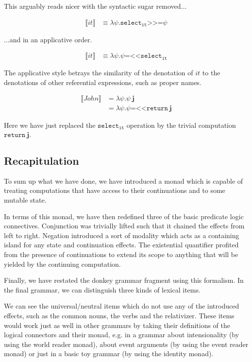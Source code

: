 \documentclass{article}
\newcommand{\hsbind}{\mathbin{\texttt{>>=}}}
\newcommand{\hsrevbind}{\mathbin{\texttt{=<<}}}
\begin{document}
This arguably reads nicer with the syntactic sugar removed...

\begin{align*}
  \llbracket it \rrbracket & \equiv \lambda \psi.
    \texttt{select}_\texttt{it} \hsbind \psi
\end{align*}

...and in an applicative order.

\begin{align*}
  \llbracket it \rrbracket & \equiv \lambda \psi.
    \psi \hsrevbind \texttt{select}_\texttt{it}
\end{align*}

The applicative style betrays the similarity of the denotation of $it$ to the
denotations of other referential expressions, such as proper names.

\begin{align*}
\llbracket John \rrbracket &= \lambda \psi. \psi\ \textbf{j} \\
                           &= \lambda \psi. \psi \hsrevbind \texttt{return}\ \textbf{j}
\end{align*}

Here we have just replaced the $\texttt{select}_\texttt{it}$ operation by the
trivial computation $\texttt{return}\ \textbf{j}$.


\subsection{Recapitulation}

To sum up what we have done, we have introduced a monad which is capable of
treating computations that have access to their continuations and to some
mutable state.

In terms of this monad, we have then redefined three of the basic predicate
logic connectives. Conjunction was trivially lifted such that it chained the
effects from left to right. Negation introduced a sort of modality which acts
as a containing island for any state and continuation effects. The existential
quantifier profited from the presence of continuations to extend its scope to
anything that will be yielded by the continuing computation.

Finally, we have restated the donkey grammar fragment using this formalism.
In the final grammar, we can distinguish three kinds of lexical items.

We can see the universal/neutral items which do not use any of the introduced
effects, such as the common nouns, the verbs and the relativizer. These items
would work just as well in other grammars by taking their definitions of the
logical connectors and their monad, e.g. in a grammar about intensionality (by
using the world reader monad), about event arguments (by using the event
reader monad) or just in a basic toy grammar (by using the identity monad).
\end{document}
